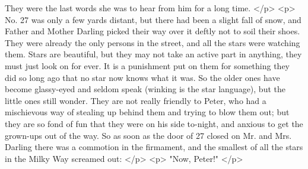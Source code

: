       They were the last words she was to hear from him for a long time.
    </p>
    <p>
      No. 27 was only a few yards distant, but there had been a slight fall of
      snow, and Father and Mother Darling picked their way over it deftly not to
      soil their shoes. They were already the only persons in the street, and
      all the stars were watching them. Stars are beautiful, but they may not
      take an active part in anything, they must just look on for ever. It is a
      punishment put on them for something they did so long ago that no star now
      knows what it was. So the older ones have become glassy-eyed and seldom
      speak (winking is the star language), but the little ones still wonder.
      They are not really friendly to Peter, who had a mischievous way of
      stealing up behind them and trying to blow them out; but they are so fond
      of fun that they were on his side to-night, and anxious to get the
      grown-ups out of the way. So as soon as the door of 27 closed on Mr. and
      Mrs. Darling there was a commotion in the firmament, and the smallest of
      all the stars in the Milky Way screamed out:
    </p>
    <p>
      "Now, Peter!"
    </p>
